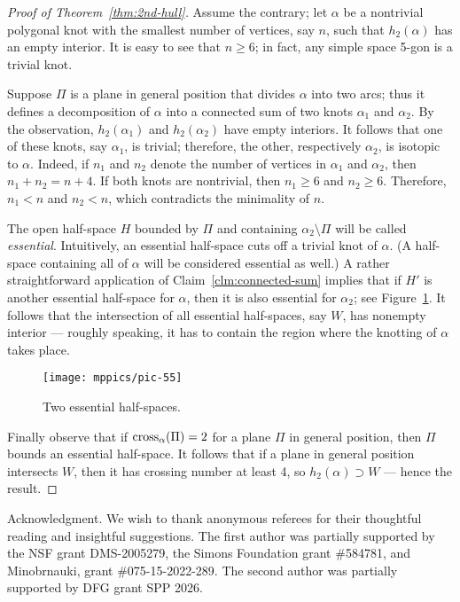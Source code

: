 \documentclass{article}
\newcommand*{\arXiv}[2]{#1} %
\theoremstyle{theorem}
\newtheorem{Crofton-type formula}[theorem]{Crofton-type formula}
\newtheorem{Douglas--Rado theorem}[theorem]{\arXiv{Douglas--Rado theorem}{Theorem}}
\newtheorem{Extended monotonicity theorem}[theorem]{\arXiv{Extended monotonicity theorem}{Theorem}}
\theoremstyle{definition}
\def\cross{\mathop{\rm cross}\nolimits}
\def\ge{\geqslant}
\begin{document}
\begin{proof}[Proof of Theorem~\ref{thm:2nd-hull}]
Assume the contrary; let $\alpha$ be a nontrivial polygonal knot with the smallest number of vertices, say $n$, such that $h_2(\alpha)$ has an empty interior.
It is easy to see that $n\ge 6$;
in fact, any simple space 5-gon is a trivial knot.

Suppose $\Pi$ is a plane in general position that divides $\alpha$ into two arcs; thus it defines a decomposition of $\alpha$ into a connected sum of two knots $\alpha_1$ and $\alpha_2$.
By the observation, $h_2(\alpha_1)$ and $h_2(\alpha_2)$ have empty interiors.
It follows that one of these knots, say $\alpha_1$, is trivial;
therefore, the other, respectively $\alpha_2$, is isotopic to $\alpha$.
Indeed, if $n_1$ and $n_2$ denote the number of vertices in $\alpha_1$ and $\alpha_2$, then $n_1+n_2=n+4$. 
If both knots are nontrivial, then $n_1\ge 6$ and $n_2\ge 6$.
Therefore, $n_1<n$ and $n_2<n$, which contradicts the minimality of $n$.

The open half-space $H$ bounded by $\Pi$ and containing $\alpha_2\setminus\Pi$ will be called \emph{essential}. Intuitively, an essential half-space cuts off
a trivial knot of $\alpha$. (A half-space containing all of $\alpha$ will be considered essential as well.)
A rather straightforward application of Claim~\ref{clm:connected-sum} implies that if $H'$ is another essential half-space for $\alpha$, then it is also essential for $\alpha_2$; see Figure~\ref{fig13}.
It follows that the intersection of all essential half-spaces, say $W$, has nonempty interior --- roughly speaking, it has to contain the region where the knotting of $\alpha$ takes place.

\begin{figure}[!ht]
\vskip-0mm
\centering
\arXiv{\texttt{[image: mppics/pic-55]}}{\texttt{[image: pic-55]}}
\vskip0mm
\caption{Two essential half-spaces.}
\label{fig13}
\end{figure}

Finally observe that if $\cross_\alpha(\Pi)=2$ for a plane $\Pi$ in general position, then $\Pi$ bounds an essential half-space. 
It follows that if a plane in general position intersects $W$, then it has  crossing number at least 4,
so $h_2(\alpha)\supset W$ --- hence the result.
\end{proof}




\begin{acknowledgment}{Acknowledgment.}
We wish to thank anonymous referees for their thoughtful reading and insightful suggestions.
The first author was partially supported by the NSF grant DMS-2005279, the Simons Foundation grant \#584781, and Minobrnauki, grant \#075-15-2022-289.
The second author was partially supported by DFG grant SPP 2026. 
\end{acknowledgment}
\end{document}
